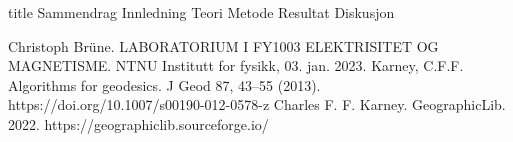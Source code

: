 \documentclass[5p]{article}
\begin{document}
{title} %
{Sammendrag}
\pagebreak
{Innledning}
{Teori}
{Metode}
{Resultat}
{Diskusjon}

\begin{thebibliography}{5}
Christoph Brüne. LABORATORIUM I FY1003 ELEKTRISITET OG MAGNETISME. NTNU Institutt for fysikk, 03. jan. 2023.
 Karney, C.F.F. Algorithms for geodesics. J Geod 87, 43–55 (2013). https://doi.org/10.1007/s00190-012-0578-z
 Charles F. F. Karney. GeographicLib. 2022.
https://geographiclib.sourceforge.io/
\end{thebibliography}
\end{document}
